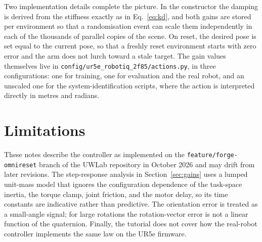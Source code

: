 \documentclass{article}
\newcommand{\code}[1]{\texttt{#1}}
\begin{document}
Two implementation details complete the picture. In the constructor the damping is derived from the stiffness exactly as in Eq.~\eqref{eq:kd}, and both gains are stored per environment so that a randomisation event can scale them independently in each of the thousands of parallel copies of the scene. On reset, the desired pose is set equal to the current pose, so that a freshly reset environment starts with zero error and the arm does not lurch toward a stale target. The gain values themselves live in \code{config/ur5e\_robotiq\_2f85/actions.py}, in three configurations: one for training, one for evaluation and the real robot, and an unscaled one for the system-identification scripts, where the action is interpreted directly in metres and radians.

\section{Limitations}

These notes describe the controller as implemented on the \code{feature/forge-omnireset} branch of the UWLab repository in October 2026 and may drift from later revisions. The step-response analysis in Section~\ref{sec:gains} uses a lumped unit-mass model that ignores the configuration dependence of the task-space inertia, the torque clamp, joint friction, and the motor delay, so its time constants are indicative rather than predictive. The orientation error is treated as a small-angle signal; for large rotations the rotation-vector error is not a linear function of the quaternion. Finally, the tutorial does not cover how the real-robot controller implements the same law on the UR5e firmware.


\end{document}
